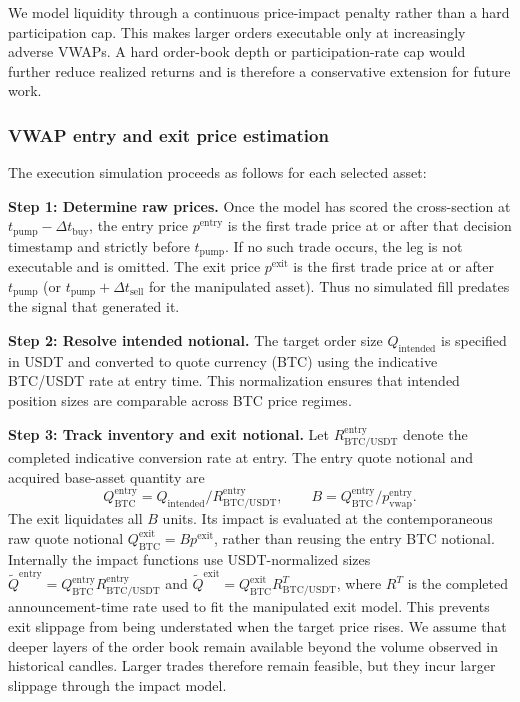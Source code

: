 \documentclass{ieeeaccess}
\begin{document}
We model liquidity through a continuous price-impact penalty rather than a hard participation cap. This makes larger orders executable only at increasingly adverse VWAPs. A hard order-book depth or participation-rate cap would further reduce realized returns and is therefore a conservative extension for future work.

\subsubsection{VWAP entry and exit price estimation}
\label{sec:vwap_estimation}

The execution simulation proceeds as follows for each selected asset:

\textbf{Step 1: Determine raw prices.} Once the model has scored the cross-section at $t_{\mathrm{pump}} - \Delta t_{\mathrm{buy}}$, the entry price $p^{\mathrm{entry}}$ is the first trade price at or after that decision timestamp and strictly before $t_{\mathrm{pump}}$. If no such trade occurs, the leg is not executable and is omitted. The exit price $p^{\mathrm{exit}}$ is the first trade price at or after $t_{\mathrm{pump}}$ (or $t_{\mathrm{pump}} + \Delta t_{\mathrm{sell}}$ for the manipulated asset). Thus no simulated fill predates the signal that generated it.

\textbf{Step 2: Resolve intended notional.} The target order size $Q_{\mathrm{intended}}$ is specified in USDT and converted to quote currency (BTC) using the indicative BTC/USDT rate at entry time. This normalization ensures that intended position sizes are comparable across BTC price regimes.

\textbf{Step 3: Track inventory and exit notional.} Let $R^{\mathrm{entry}}_{\mathrm{BTC/USDT}}$ denote the completed indicative conversion rate at entry. The entry quote notional and acquired base-asset quantity are
\begin{equation}
    Q^{\mathrm{entry}}_{\mathrm{BTC}}
      = Q_{\mathrm{intended}}/R^{\mathrm{entry}}_{\mathrm{BTC/USDT}},
    \qquad
    B = Q^{\mathrm{entry}}_{\mathrm{BTC}}/p^{\mathrm{entry}}_{\mathrm{vwap}}.
\end{equation}
The exit liquidates all $B$ units. Its impact is evaluated at the contemporaneous raw quote notional $Q^{\mathrm{exit}}_{\mathrm{BTC}}=B p^{\mathrm{exit}}$, rather than reusing the entry BTC notional. Internally the impact functions use USDT-normalized sizes $\widetilde Q^{\mathrm{entry}}=Q^{\mathrm{entry}}_{\mathrm{BTC}}R^{\mathrm{entry}}_{\mathrm{BTC/USDT}}$ and $\widetilde Q^{\mathrm{exit}}=Q^{\mathrm{exit}}_{\mathrm{BTC}}R^{T}_{\mathrm{BTC/USDT}}$, where $R^{T}$ is the completed announcement-time rate used to fit the manipulated exit model. This prevents exit slippage from being understated when the target price rises. We assume that deeper layers of the order book remain available beyond the volume observed in historical candles. Larger trades therefore remain feasible, but they incur larger slippage through the impact model.
\end{document}
